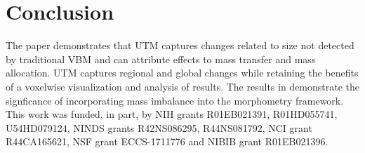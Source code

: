 \documentclass{llncs}
\begin{document}
\section{Conclusion}
The paper demonstrates that UTM captures changes related to size not detected
by traditional VBM and can attribute effects to mass transfer and mass
allocation. UTM captures regional and global changes while retaining the
benefits of a voxelwise visualization and analysis of results.  The results in
demonstrate the signficance of incorporating mass imbalance into the morphometry
framework.  \\

 This work was funded, in part, by NIH grants
R01EB021391, R01HD055741, U54HD079124, NINDS grants R42NS086295,
R44NS081792, NCI grant R44CA165621, NSF grant ECCS-1711776 and NIBIB grant R01EB021396.
\vspace{-0.15in}


\end{document}
